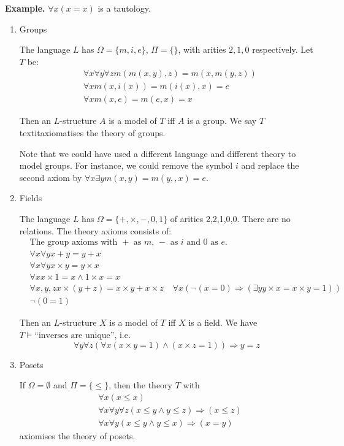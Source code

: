 \documentclass{article}
\theoremstyle{definition}
\numberwithin{definition}{section}
\newcommand{\entails}{\models}
\begin{document}
\textbf{Example.} $\forall x (x=x)$ is a tautology. 
\begin{enumerate}[i]
  \item Groups
    
    The language $L$ has $\Omega = \{m,i,e\}$, $\Pi = \{\}$, with 
    arities $2,1,0$ respectively. Let $T$ be:
    \begin{align*}
      & \forall x \forall y \forall z m(m(x,y),z) = m(x,m(y,z)) \\
      & \forall x m(x,i(x)) = m(i(x),x) = e \\
      & \forall x m(x,e) = m(e,x) = x
    \end{align*}

    Then an $L$-structure $A$ is a model of $T$ iff $A$ is a group. 
    We say $T$ textit{axiomatises} the theory of groups. 

    Note that we could have used a different language and  different theory 
    to model groups. For instance, we could remove the symbol $i$ and 
    replace the second axiom by $\forall x \exists y m(x,y) = m(y,,x) = e$.

  \item Fields

    The language $L$ has $\Omega = \{+,\times,-,0,1\}$ of arities 2,2,1,0,0. 
    There are no relations. The theory axioms consists of: 
    \begin{align*}
      & \text{The group axioms with $+$ as $m$, $-$ as $i$ and $0$ as $e$.} \\
      & \forall x \forall y x+y=y+x \\
      & \forall x \forall y x \times y = y \times x \\
      & \forall x x \times 1 = x \land 1 \times x = x \\
      & \forall x,y,z x \times (y+z) = x \times y + x \times z
      & \forall x (\neg (x=0) \Rightarrow (\exists y y \times x = x \times y = 1)) \\
      & \neg (0=1)
    \end{align*}

    Then an $L$-structure $X$ is a model of $T$ iff $X$ is a field. 
    We have $T \entails \text{``inverses are unique''}$, i.e.
    $$\forall y \forall z (\forall x (x \times y = 1) \land (x \times z = 1)) 
      \Rightarrow y=z$$

  \item Posets

    If $\Omega = \emptyset$ and $\Pi = \{\le\}$, then the theory $T$ with
    \begin{align*}
      & \forall x (x \leq x) \\
      & \forall x \forall y \forall z (x \le y \land y \le z) \Rightarrow (x \le z) \\
      & \forall x \forall y (x \le y \land y \le x) \Rightarrow (x = y)
    \end{align*}
    axiomises the theory of posets. 


\end{enumerate}
\end{document}
